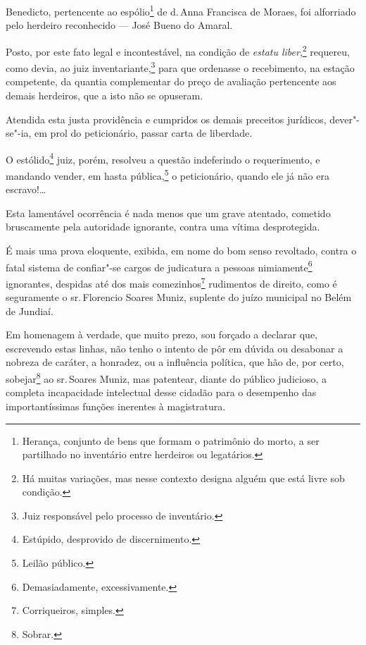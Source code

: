 \noindent{}

Benedicto, pertencente ao espólio\footnote{Herança, conjunto de bens
  que formam o patrimônio do morto, a ser partilhado no inventário entre
  herdeiros ou legatários.} de d.\,Anna Francisca de Moraes, foi
alforriado pelo herdeiro reconhecido --- José Bueno do Amaral.

Posto, por este fato legal e incontestável, na condição de \emph{estatu
liber},\footnote{Há muitas variações, mas nesse contexto designa alguém
  que está livre sob condição.} requereu, como devia, ao juiz
inventariante,\footnote{Juiz responsável pelo processo de inventário.}
para que ordenasse o recebimento, na estação competente, da quantia
complementar do preço de avaliação pertencente aos demais herdeiros, que
a isto não se opuseram.

Atendida esta justa providência e cumpridos os demais preceitos
jurídicos, dever"-se"-ia, em prol do peticionário, passar carta de
liberdade.

O estólido\footnote{Estúpido, desprovido de discernimento.} juiz,
porém, resolveu a questão indeferindo o requerimento, e mandando vender,
em hasta pública,\footnote{Leilão público.} o peticionário, quando ele
já não era escravo!\ldots{}

Esta lamentável ocorrência é nada menos que um grave atentado, cometido
bruscamente pela autoridade ignorante, contra uma vítima desprotegida.

É mais uma prova eloquente, exibida, em nome do bom senso revoltado,
contra o fatal sistema de confiar"-se cargos de judicatura a pessoas
nimiamente\footnote{Demasiadamente, excessivamente.} ignorantes,
despidas até dos mais comezinhos\footnote{Corriqueiros, simples.}
rudimentos de direito, como é seguramente o sr.\,Florencio Soares Muniz,
suplente do juízo municipal no Belém de Jundiaí.

Em homenagem à verdade, que muito prezo, sou forçado a declarar que,
escrevendo estas linhas, não tenho o intento de pôr em dúvida ou
desabonar a nobreza de caráter, a honradez, ou a influência política,
que hão de, por certo, sobejar\footnote{Sobrar.} ao sr.\,Soares Muniz,
mas patentear, diante do público judicioso, a completa incapacidade
intelectual desse cidadão para o desempenho das importantíssimas funções
inerentes à magistratura.

